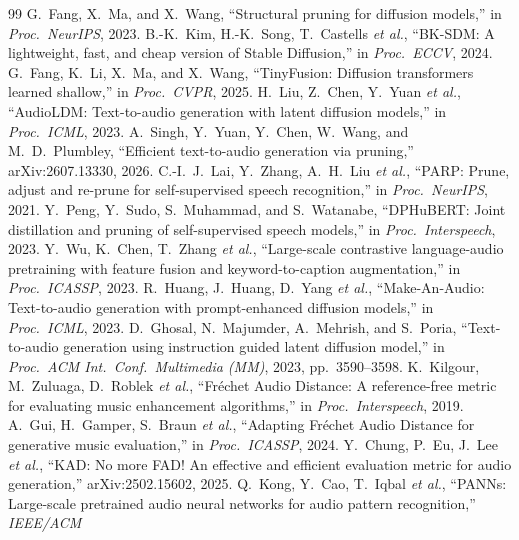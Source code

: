 \clearpage
{\setlength{\itemsep}{0pt}\setlength{\parsep}{0pt}
\begin{thebibliography}{99}
 G.~Fang, X.~Ma, and X.~Wang, ``Structural pruning for diffusion
models,'' in \emph{Proc.\ NeurIPS}, 2023.
 B.-K.~Kim, H.-K.~Song, T.~Castells \emph{et al.}, ``BK-SDM: A lightweight, fast,
and cheap version of Stable Diffusion,'' in \emph{Proc.\ ECCV}, 2024.
 G.~Fang, K.~Li, X.~Ma, and X.~Wang, ``TinyFusion: Diffusion transformers
learned shallow,'' in \emph{Proc.\ CVPR}, 2025.
 H.~Liu, Z.~Chen, Y.~Yuan \emph{et al.}, ``AudioLDM: Text-to-audio generation with latent diffusion models,'' in
\emph{Proc.\ ICML}, 2023.
 A.~Singh, Y.~Yuan, Y.~Chen, W.~Wang, and M.~D.~Plumbley, ``Efficient
text-to-audio generation via pruning,'' arXiv:2607.13330, 2026.
 C.-I.~J.~Lai, Y.~Zhang, A.~H.~Liu \emph{et al.}, ``PARP: Prune, adjust and
re-prune for self-supervised speech recognition,'' in \emph{Proc.\ NeurIPS}, 2021.
 Y.~Peng, Y.~Sudo, S.~Muhammad, and S.~Watanabe, ``DPHuBERT: Joint
distillation and pruning of self-supervised speech models,'' in \emph{Proc.\ Interspeech}, 2023.
 Y.~Wu, K.~Chen, T.~Zhang \emph{et al.},
``Large-scale contrastive language-audio pretraining with feature fusion and keyword-to-caption
augmentation,'' in \emph{Proc.\ ICASSP}, 2023.
 R.~Huang, J.~Huang, D.~Yang \emph{et al.}, ``Make-An-Audio:
Text-to-audio generation with prompt-enhanced diffusion models,'' in \emph{Proc.\ ICML}, 2023.
 D.~Ghosal, N.~Majumder, A.~Mehrish, and S.~Poria, ``Text-to-audio generation
using instruction guided latent diffusion model,'' in \emph{Proc.\ ACM Int.\ Conf.\ Multimedia (MM)},
2023, pp.~3590--3598.
 K.~Kilgour, M.~Zuluaga, D.~Roblek \emph{et al.}, ``Fr\'echet Audio
Distance: A reference-free metric for evaluating music enhancement algorithms,'' in
\emph{Proc.\ Interspeech}, 2019.
 A.~Gui, H.~Gamper, S.~Braun \emph{et al.}, ``Adapting Fr\'echet Audio
Distance for generative music evaluation,'' in \emph{Proc.\ ICASSP}, 2024.
 Y.~Chung, P.~Eu, J.~Lee \emph{et al.}, ``KAD: No more FAD!
An effective and efficient evaluation metric for audio generation,'' arXiv:2502.15602, 2025.
 Q.~Kong, Y.~Cao, T.~Iqbal \emph{et al.}, ``PANNs:
Large-scale pretrained audio neural networks for audio pattern recognition,'' \emph{IEEE/ACM
}
\end{thebibliography}}
